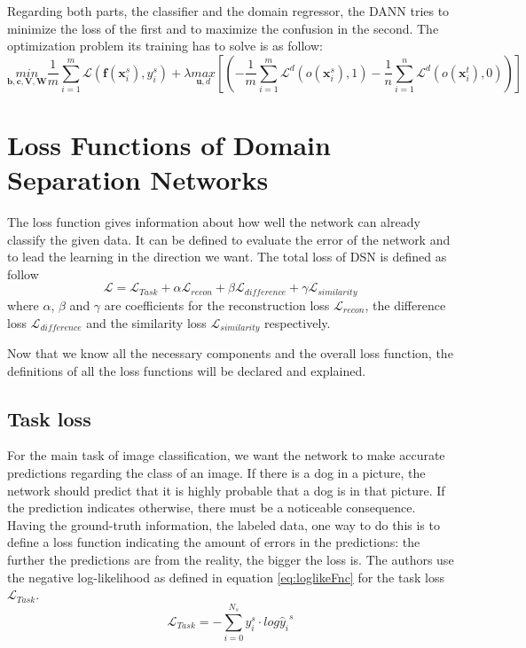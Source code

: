 Regarding both parts, the classifier and the domain regressor, the DANN tries to minimize the loss of the first and to maximize the confusion in the second. The optimization problem its training has to solve is as follow:
	\begin{equation} \label{eq:optDANN} 
			\underset{\bm{b}, \bm{c}, \bm{V}, \bm{W}}{min}\frac{1}{m}\underset{i=1}{\overset{m}{\sum}}\mathcal{L}\left(\bm{f}\left(\bm{x}_i^s\right), y_i^s\right) + \lambda\underset{\bm{u}, d}{max}\left[\left(-\frac{1}{m}\underset{i=1}{\overset{m}{\sum}}\mathcal{L}^d\left(o\left(\bm{x}_i^s\right), 1\right) - \frac{1}{n}\underset{i=1}{\overset{n}{\sum}}\mathcal{L}^d\left(o\left(\bm{x}_i^t\right), 0\right)\right)\right]
	\end{equation} 


\section{Loss Functions of Domain Separation Networks} \label{sec:dsnLoss}
The loss function gives information about how well the network can already classify the given data. It can be defined to evaluate the error of the network and to lead the learning in the direction we want. The total loss of DSN is defined as follow 
	\begin{equation} \label{eq:lossesDSN}
			\mathcal{L} = \mathcal{L}_{Task} + \alpha \mathcal{L}_{recon} + \beta \mathcal{L}_{difference} + \gamma \mathcal{L}_{similarity}
	\end{equation}
where $\alpha$, $\beta$ and $\gamma$ are coefficients for the reconstruction loss $\mathcal{L}_{recon}$, the difference loss $\mathcal{L}_{difference}$ and the similarity loss $\mathcal{L}_{similarity}$ respectively. 

Now that we know all the necessary components and the overall loss function, the definitions of all the loss functions will be declared and explained.

\subsection*{Task loss}
For the main task of image classification, we want the network to make accurate predictions regarding the class of an image. If there is a dog in a picture, the network should predict that it is highly probable that a dog is in that picture. If the prediction indicates otherwise, there must be a noticeable consequence. Having the ground-truth information, the labeled data, one way to do this is to define a loss function indicating the amount of errors in the predictions: the further the predictions are from the reality, the bigger the loss is. The authors use the negative log-likelihood as defined in equation \eqref{eq:loglikeFnc} for the task loss $\mathcal{L}_{Task}$.
	\begin{equation} \label{eq:loglikeFnc}
			\mathcal{L}_{Task} = -\overset{N_s}{\underset{i = 0}{\sum}}y_i^s \cdot log {\hat{y}_i}^s
	\end{equation}

